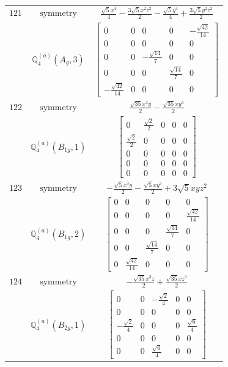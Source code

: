\documentclass[fleqn,8pt,landscape]{jsarticle}
\begin{document}
\begin{longtable}{ccc}
$ 121 $ & $ \text{symmetry} $ & $ \frac{\sqrt{5} x^{4}}{4} - \frac{3 \sqrt{5} x^{2} z^{2}}{2} - \frac{\sqrt{5} y^{4}}{4} + \frac{3 \sqrt{5} y^{2} z^{2}}{2} $ \\
$  $ & $ \mathbb{Q}_{4}^{(a)}(A_{g},3) $ & $ \begin{bmatrix} 0 & 0 & 0 & 0 & - \frac{\sqrt{42}}{14} \\ 0 & 0 & 0 & 0 & 0 \\ 0 & 0 & - \frac{\sqrt{14}}{7} & 0 & 0 \\ 0 & 0 & 0 & \frac{\sqrt{14}}{7} & 0 \\ - \frac{\sqrt{42}}{14} & 0 & 0 & 0 & 0 \end{bmatrix} $ \\ \hline
$ 122 $ & $ \text{symmetry} $ & $ \frac{\sqrt{35} x^{3} y}{2} - \frac{\sqrt{35} x y^{3}}{2} $ \\
$  $ & $ \mathbb{Q}_{4}^{(a)}(B_{1g},1) $ & $ \begin{bmatrix} 0 & \frac{\sqrt{2}}{2} & 0 & 0 & 0 \\ \frac{\sqrt{2}}{2} & 0 & 0 & 0 & 0 \\ 0 & 0 & 0 & 0 & 0 \\ 0 & 0 & 0 & 0 & 0 \\ 0 & 0 & 0 & 0 & 0 \end{bmatrix} $ \\ \hline
$ 123 $ & $ \text{symmetry} $ & $ - \frac{\sqrt{5} x^{3} y}{2} - \frac{\sqrt{5} x y^{3}}{2} + 3 \sqrt{5} x y z^{2} $ \\
$  $ & $ \mathbb{Q}_{4}^{(a)}(B_{1g},2) $ & $ \begin{bmatrix} 0 & 0 & 0 & 0 & 0 \\ 0 & 0 & 0 & 0 & \frac{\sqrt{42}}{14} \\ 0 & 0 & 0 & \frac{\sqrt{14}}{7} & 0 \\ 0 & 0 & \frac{\sqrt{14}}{7} & 0 & 0 \\ 0 & \frac{\sqrt{42}}{14} & 0 & 0 & 0 \end{bmatrix} $ \\ \hline
$ 124 $ & $ \text{symmetry} $ & $ - \frac{\sqrt{35} x^{3} z}{2} + \frac{\sqrt{35} x z^{3}}{2} $ \\
$  $ & $ \mathbb{Q}_{4}^{(a)}(B_{2g},1) $ & $ \begin{bmatrix} 0 & 0 & - \frac{\sqrt{2}}{4} & 0 & 0 \\ 0 & 0 & 0 & 0 & 0 \\ - \frac{\sqrt{2}}{4} & 0 & 0 & 0 & \frac{\sqrt{6}}{4} \\ 0 & 0 & 0 & 0 & 0 \\ 0 & 0 & \frac{\sqrt{6}}{4} & 0 & 0 \end{bmatrix} $ \\ \hline

\end{longtable}
\end{document}

